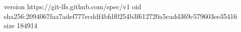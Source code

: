 version https://git-lfs.github.com/spec/v1
oid sha256:2094067faa7adef777ecddf4bfdf0254b3f612720a5cadd369c579603ee35416
size 184914
